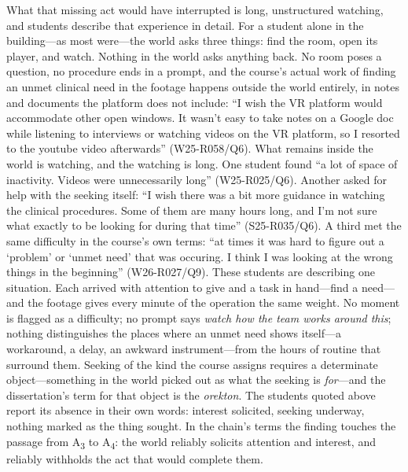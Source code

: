 What that missing act would have interrupted is long, unstructured
watching, and students describe that experience in detail. For a student
alone in the building---as most were---the world asks three things: find
the room, open its player, and watch. Nothing in the world asks anything
back. No room poses a question, no procedure ends in a prompt, and the
course's actual work of finding an unmet clinical need in the footage
happens outside the world entirely, in notes and documents the platform
does not include: ``I wish the VR platform would accommodate
other open windows. It wasn't easy to take notes on a Google doc while
listening to interviews or watching videos on the VR platform, so I
resorted to the youtube video afterwards'' (W25-R058/Q6). What remains
inside the world is watching, and the watching is long. One student found
``a lot of space of inactivity. Videos were unnecessarily long''
(W25-R025/Q6). Another asked for help with the seeking itself: ``I wish
there was a bit more guidance in watching the clinical procedures. Some of
them are many hours long, and I'm not sure what exactly to be looking for
during that time'' (S25-R035/Q6). A third met the same difficulty in the
course's own terms: ``at times it was hard to figure out a `problem' or
`unmet need' that was occuring. I think I was looking at the wrong things
in the beginning'' (W26-R027/Q9). These students are describing one
situation. Each arrived with attention to give and a task in hand---find a
need---and the footage gives every minute of the operation the same weight.
No moment is flagged as a difficulty; no prompt says \textit{watch how the
team works around this}; nothing distinguishes the places where an unmet
need shows itself---a workaround, a delay, an awkward instrument---from the
hours of routine that surround them. Seeking of the kind the course assigns requires a determinate
object---something in the world picked out as what the seeking is
\textit{for}---and the dissertation's term for that object is the
\textit{orekton}. The students quoted above report its absence in their own
words: interest solicited, seeking underway, nothing marked as the thing
sought. In the chain's terms the finding touches the passage from
A\textsubscript{3} to A\textsubscript{4}: the world reliably solicits
attention and interest, and reliably withholds the act that would complete
them.
